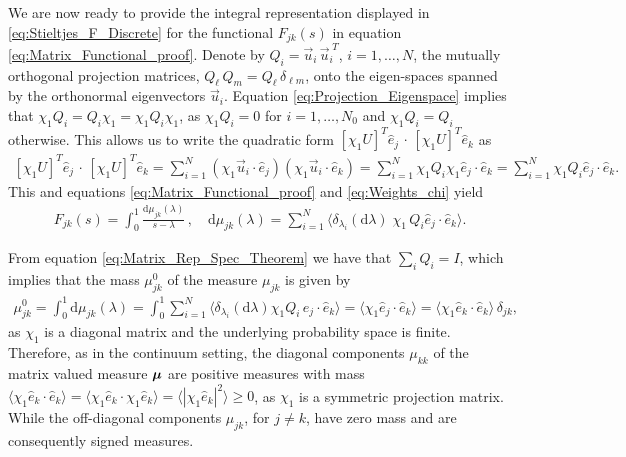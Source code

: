 \documentclass{cmslatex}
\renewcommand{\d}{\text{d}}
\newcommand\bmu{\mbox{\boldmath${\mu}$}}
\begin{document}
We are now ready to provide the integral representation displayed in
\eqref{eq:Stieltjes_F_Discrete} for the functional $F_{jk}(s)$ in
equation \eqref{eq:Matrix_Functional_proof}. Denote by
$Q_i=\vec{u}_i\,\vec{u}_i^{\;T}$, $i=1,\ldots,N$, the mutually orthogonal
projection matrices, $Q_\ell\,Q_m=Q_\ell\,\delta_{\ell m}$, onto the eigen-spaces
spanned by the orthonormal eigenvectors $\vec{u}_i$. Equation
\eqref{eq:Projection_Eigenspace} implies that
$\chi_1Q_i=Q_i\chi_1=\chi_1Q_i\chi_1$, as $\chi_1Q_i=0$ for $i=1,\ldots,N_0$ and
$\chi_1Q_i=Q_i$ otherwise. This allows us to write the quadratic form
$[\chi_1U]^T\hat{e}_j\,\cdot\,[\chi_1U]^T\hat{e}_k$ as  
%
\begin{align}\label{eq:Quadratic_form}
  [\chi_1U]^T\hat{e}_j\,\cdot\,[\chi_1U]^T\hat{e}_k=\sum_{i=1}^N(\chi_1\vec{u}_i\cdot\hat{e}_j)
                                     (\chi_1\vec{u}_i\cdot\hat{e}_k)
                              =\sum_{i=1}^N \chi_1Q_i\chi_1\hat{e}_j\cdot\hat{e}_k
                              =\sum_{i=1}^N \chi_1Q_i\hat{e}_j\cdot\hat{e}_k.
\end{align}
%
This and equations \eqref{eq:Matrix_Functional_proof} and
\eqref{eq:Weights_chi} yield
%
\begin{align}\label{eq:Stieltjes_F_DiscretE}
  F_{jk}(s)=\int_0^1\frac{\d\mu_{jk}(\lambda)}{s-\lambda}\,, \quad
  \d\mu_{jk}(\lambda)=\sum_{i=1}^N\langle \delta_{\lambda_i}(\d\lambda)\;\chi_1\,Q_i\hat{e}_j\cdot\hat{e}_k\rangle.
\end{align}
%



From equation \eqref{eq:Matrix_Rep_Spec_Theorem} we have that
$\sum_iQ_i=I$, which implies that the mass $\mu^0_{jk}$ of the measure
$\mu_{jk}$ is given by
%
\begin{align}\label{eq:Measure_Mass_Lattice}
  \mu^0_{jk}=\int_0^1\d\mu_{jk}(\lambda)
       =\int_0^1\sum_{i=1}^N \langle\delta_{\lambda_i}(\d\lambda)\chi_1Q_i\,\hat{e}_j\cdot\hat{e}_k\rangle
       =\langle\chi_1\hat{e}_j\cdot\hat{e}_k\rangle
       =\langle\chi_1\hat{e}_k\cdot\hat{e}_k\rangle\,\delta_{jk},          
\end{align}
%
as $\chi_1$ is a diagonal matrix and the underlying probability space is
finite. Therefore, as in the continuum setting, the diagonal
components $\mu_{kk}$ of the matrix valued measure $\bmu$ are positive
measures with mass
$\langle\chi_1\hat{e}_k\cdot\hat{e}_k\rangle=\langle\chi_1\hat{e}_k\cdot\chi_1\hat{e}_k\rangle=\langle|\chi_1\hat{e}_k|^2\rangle\geq0$,
as $\chi_1$ is a symmetric projection matrix. While the off-diagonal
components $\mu_{jk}$, for $j\neq k$, have zero mass and are consequently
signed measures.
\end{document}
